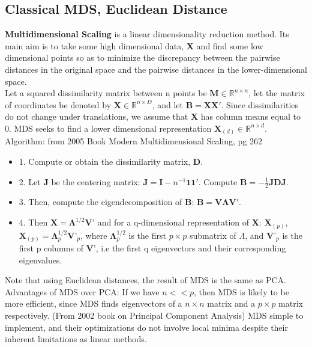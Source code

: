 \documentclass[12pt]{report}
\begin{document}
\subsection{Classical MDS, Euclidean Distance}

\textbf{Multidimensional Scaling} is a linear dimensionality reduction method. Its main aim is to take some high dimensional data, \textbf{X} and find some low dimensional points so as to minimize the discrepancy between the pairwise distances in the original space and the pairwise distances in the lower-dimensional space. \\
Let a squared dissimilarity matrix between n points be $\textbf{M} \in \mathbb{R}^{n \times n}$, let the matrix of coordinates be denoted by $\textbf{X} \in \mathbb{R}^{n \times D}$, and let $\textbf{B} = \textbf{X}\textbf{X}'$. Since dissimilarities do not change under translations, we assume that \textbf{X} has column means equal to 0. MDS seeks to find a lower dimensional representation $\textbf{X}_{(d)} \in \mathbb{R}^{n \times d}$.\\
Algorithm: from 2005 Book Modern Multidimensional Scaling, pg 262
\begin{itemize}
    \item 1. Compute or obtain the dissimilarity matrix, \textbf{D}.
    \item 2. Let \textbf{J} be the centering matrix: $\textbf{J} = \textbf{I} - n^{-1}\mathbf{1}\mathbf{1}'$. Compute $\textbf{B} = -\frac{1}{2}\textbf{J}\textbf{D}\textbf{J}$.
    \item 3. Then, compute the eigendecomposition of \textbf{B}: $\textbf{B} = \textbf{V}\mathbf{\Lambda}\textbf{V}'$. 
    \item 4. Then $\textbf{X} = \mathbf{\Lambda}^{1/2}\textbf{V}'$ and for a q-dimensional representation  of \textbf{X}: $\textbf{X}_{(p)}$, $\textbf{X}_{(p)} = \mathbf{\Lambda}^{1/2}_p\textbf{V'}_p$, where $\mathbf{\Lambda}^{1/2}_p$ is the first $p \times p$ submatrix of $\Lambda$, and $\textbf{V'}_p$ is the first p columns of \textbf{V}', i.e the first q eigenvectors and their corresponding eigenvalues.
\end{itemize}
Note that using Euclidean distances, the result of MDS is the same as PCA.
Advantages of MDS over PCA: If we have $n << p$, then MDS is likely to be more efficient, since MDS finds eigenvectors of a $n \times n$ matrix and a $p \times p$ matrix respectively. (From 2002 book on Principal Component Analysis)
MDS simple to implement, and their optimizations do not involve local minima despite their inherent limitations as linear methods.
\end{document}
